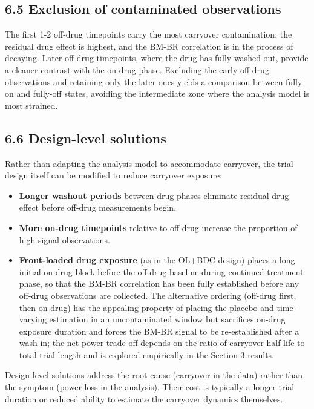 \documentclass[11pt]{article}
\begin{document}
\subsection{6.5 Exclusion of contaminated observations}

The first 1-2 off-drug timepoints carry the most carryover
contamination: the residual drug effect is highest, and the
BM-BR correlation is in the process of decaying. Later off-drug
timepoints, where the drug has fully washed out, provide a
cleaner contrast with the on-drug phase. Excluding the early
off-drug observations and retaining only the later ones yields
a comparison between fully-on and fully-off states, avoiding the
intermediate zone where the analysis model is most strained.

\subsection{6.6 Design-level solutions}

Rather than adapting the analysis model to accommodate carryover,
the trial design itself can be modified to reduce carryover
exposure:

\begin{itemize}
\item \textbf{Longer washout periods} between drug phases eliminate
  residual drug effect before off-drug measurements begin.
\item \textbf{More on-drug timepoints} relative to off-drug increase the
  proportion of high-signal observations.
\item \textbf{Front-loaded drug exposure} (as in the OL+BDC design)
  places a long initial on-drug block before the off-drug
  baseline-during-continued-treatment phase, so that the BM-BR
  correlation has been fully established before any off-drug
  observations are collected. The alternative ordering
  (off-drug first, then on-drug) has the appealing property of
  placing the placebo and time-varying estimation in an
  uncontaminated window but sacrifices on-drug exposure duration
  and forces the BM-BR signal to be re-established after a
  wash-in; the net power trade-off depends on the ratio of
  carryover half-life to total trial length and is explored
  empirically in the Section 3 results.
\end{itemize}

Design-level solutions address the root cause (carryover in the
data) rather than the symptom (power loss in the analysis). Their
cost is typically a longer trial duration or reduced ability to
estimate the carryover dynamics themselves.
\end{document}
